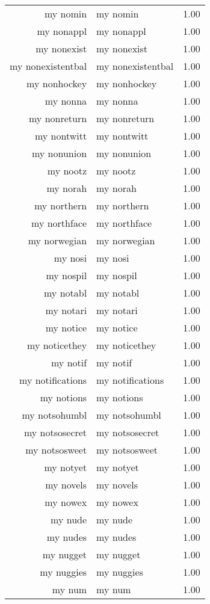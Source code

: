 \begin{table}[ht]
\begin{tabular}{rlr}
  my nomin & my nomin & 1.00 \\ 
  my nonappl & my nonappl & 1.00 \\ 
  my nonexist & my nonexist & 1.00 \\ 
  my nonexistentbal & my nonexistentbal & 1.00 \\ 
  my nonhockey & my nonhockey & 1.00 \\ 
  my nonna & my nonna & 1.00 \\ 
  my nonreturn & my nonreturn & 1.00 \\ 
  my nontwitt & my nontwitt & 1.00 \\ 
  my nonunion & my nonunion & 1.00 \\ 
  my nootz & my nootz & 1.00 \\ 
  my norah & my norah & 1.00 \\ 
  my northern & my northern & 1.00 \\ 
  my northface & my northface & 1.00 \\ 
  my norwegian & my norwegian & 1.00 \\ 
  my nosi & my nosi & 1.00 \\ 
  my nospil & my nospil & 1.00 \\ 
  my notabl & my notabl & 1.00 \\ 
  my notari & my notari & 1.00 \\ 
  my notice & my notice & 1.00 \\ 
  my noticethey & my noticethey & 1.00 \\ 
  my notif & my notif & 1.00 \\ 
  my notifications & my notifications & 1.00 \\ 
  my notions & my notions & 1.00 \\ 
  my notsohumbl & my notsohumbl & 1.00 \\ 
  my notsosecret & my notsosecret & 1.00 \\ 
  my notsosweet & my notsosweet & 1.00 \\ 
  my notyet & my notyet & 1.00 \\ 
  my novels & my novels & 1.00 \\ 
  my nowex & my nowex & 1.00 \\ 
  my nude & my nude & 1.00 \\ 
  my nudes & my nudes & 1.00 \\ 
  my nugget & my nugget & 1.00 \\ 
  my nuggies & my nuggies & 1.00 \\ 
  my num & my num & 1.00 \\ 

\end{tabular}
\end{table}
